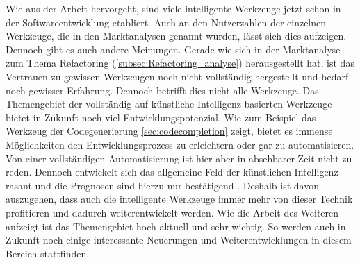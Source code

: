 Wie aus der Arbeit hervorgeht, sind viele intelligente Werkzeuge jetzt schon in der Softwareentwicklung etabliert. Auch an den Nutzerzahlen der einzelnen Werkzeuge, die in den Marktanalysen genannt wurden, lässt sich dies aufzeigen. Dennoch gibt es auch andere Meinungen. Gerade wie sich in der Marktanalyse zum Thema Refactoring (\autoref{subsec:Refactoring_analyse}) herausgestellt hat, ist das Vertrauen zu gewissen Werkzeugen noch nicht vollständig hergestellt und bedarf noch gewisser Erfahrung. Dennoch betrifft dies nicht alle Werkzeuge. 
Das Themengebiet der vollständig auf künstliche Intelligenz basierten Werkzeuge bietet in Zukunft noch viel Entwicklungspotenzial. Wie zum Beispiel das Werkzeug der Codegenerierung \autoref{sec:codecompletion} zeigt, bietet es immense Möglichkeiten den Entwicklungsprozess zu erleichtern oder gar zu automatisieren. Von einer vollständigen Automatisierung ist hier aber in absehbarer Zeit nicht zu reden. Dennoch entwickelt sich das allgemeine Feld der künstlichen Intelligenz rasant und die Prognosen sind hierzu nur bestätigend \cite{statista.2022}. Deshalb ist davon auszugehen, dass auch die intelligente Werkzeuge immer mehr von dieser Technik profitieren und dadurch weiterentwickelt werden. 
Wie die Arbeit des Weiteren aufzeigt ist das Themengebiet hoch aktuell und sehr wichtig. So werden auch in Zukunft noch einige interessante Neuerungen und Weiterentwicklungen in diesem Bereich stattfinden. 